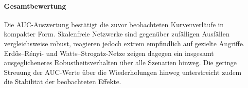\documentclass[12pt,a4paper]{article}
\begin{document}
\paragraph{Gesamtbewertung}
Die AUC-Auswertung bestätigt die zuvor beobachteten Kurvenverläufe in
kompakter Form. Skalenfreie Netzwerke sind gegenüber zufälligen Ausfällen
vergleichsweise robust, reagieren jedoch extrem empfindlich auf gezielte
Angriffe. Erdős--Rényi- und Watts--Strogatz-Netze zeigen dagegen ein insgesamt
ausgeglicheneres Robustheitsverhalten über alle Szenarien hinweg. Die geringe
Streuung der AUC-Werte über die Wiederholungen hinweg unterstreicht zudem die
Stabilität der beobachteten Effekte.
\end{document}
